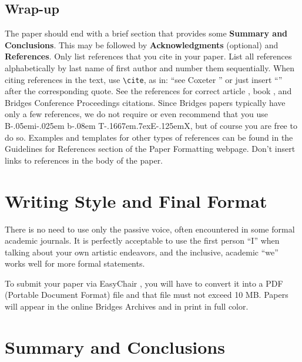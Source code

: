 \documentclass[letterpaper,11pt]{article}
\begin{document}
\subsection*{Wrap-up}

\def\BibTeX{{\rm B\kern-.05em{\sc i\kern-.025em b}\kern-.08em
    T\kern-.1667em\lower.7ex\hbox{E}\kern-.125emX}}

The paper should end with a brief section that provides some \textbf{Summary and Conclusions}. 
This may be followed by \textbf{Acknowledgments} (optional) and \textbf{References}. Only list 
references that you cite in your paper. List all references alphabetically by last name of first 
author and number them sequentially. When citing references in the text, use \verb|\cite|, as in: 
``see Coxeter \cite{Coxeter}'' or just insert ``\cite{Coxeter}'' after the corresponding quote. 
See the references for correct article \cite{EJCx,Coxeter}, book \cite{Gratzer}, and Bridges 
Conference Proceedings \cite{Sequin2016} citations. Since Bridges papers typically have only 
a few references, we do not require or even recommend that you use \BibTeX, but of course 
you are free to do so. Examples and templates for other types of references can be found in the Guidelines for References section of the Paper Formatting webpage. Don't insert links to references in the body of the paper. 


\section*{Writing Style and Final Format}

There is no need to use only the passive voice, often encountered in
some formal academic journals. It is perfectly acceptable to use the
first person ``I'' when talking about your own artistic endeavors, and
the inclusive, academic ``we'' works well for more formal statements.

To submit your paper via EasyChair \cite{easychair}, 
you will have to convert it into a PDF (Portable Document Format) file and that file must not exceed 10 MB.
Papers will appear in the online Bridges Archives and in print in full color.



\section*{Summary and Conclusions}
\end{document}
